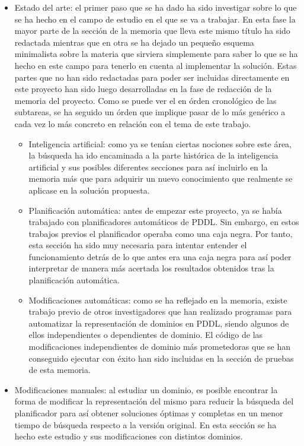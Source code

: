 \documentclass{article}
\begin{document}
\begin{itemize}
    \item Estado del arte: el primer paso que se ha dado ha sido investigar sobre lo que se ha hecho en el campo de estudio en el que se va a trabajar. En esta fase la mayor parte de la sección de la memoria que lleva este mismo título ha sido redactada mientras que en otra se ha dejado un pequeño esquema minimalista sobre la materia que sirviera simplemente para saber lo que se ha hecho en este campo para tenerlo en cuenta al implementar la solución. Estas partes que no han sido redactadas para poder ser incluidas directamente en este proyecto han sido luego desarrolladas en la fase de redacción de la memoria del proyecto. Como se puede ver el en órden cronológico de las subtareas, se ha seguido un órden que implique pasar de lo más genérico a cada vez lo más concreto en relación con el tema de este trabajo.
    
    \begin{itemize}
        \item Inteligencia artificial: como ya se tenían ciertas nociones sobre este área, la búsqueda ha ido encaminada a la parte histórica de la inteligencia artificial y sus posibles diferentes secciones para así incluirlo en la memoria más que para adquirir un nuevo conocimiento que realmente se aplicase en la solución propuesta.
        \item Planificación automática: antes de empezar este proyecto, ya se había trabajado con planificadores automáticos de PDDL. Sin embargo, en estos trabajos previos el planificador operaba como una caja negra. Por tanto, esta sección ha sido muy necesaria para intentar entender el funcionamiento detrás de lo que antes era una caja negra para así poder interpretar de manera más acertada los resultados obtenidos tras la planificación automática.
        \item Modificaciones automáticas: como se ha reflejado en la memoria, existe trabajo previo de otros investigadores que han realizado programas para automatizar la representación de dominios en PDDL, siendo algunos de ellos independientes o dependientes de dominio. El código de las modificaciones independientes de dominio más prometedoras que se han conseguido ejecutar con éxito han sido incluidas en la sección de pruebas de esta memoria.
    \end{itemize}
    
    \item Modificaciones manuales: al estudiar un dominio, es posible encontrar la forma de modificar la representación del mismo para reducir la búsqueda del planificador para así obtener soluciones óptimas y completas en un menor tiempo de búsqueda respecto a la versión original. En esta sección se ha hecho este estudio y sus modificaciones con distintos dominios.
    

\end{itemize}
\end{document}
